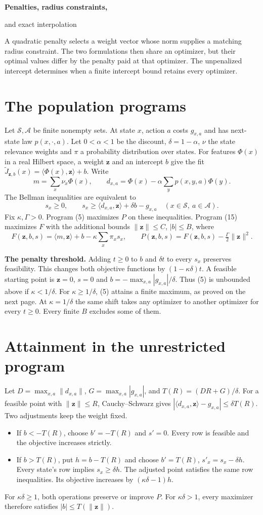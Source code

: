 \documentclass[12pt,a4paper]{article}
\newcommand{\ip}[2]{\langle #1,#2\rangle}
\newcommand{\norm}[1]{\lVert #1\rVert}
\newcommand{\vz}{\mathbf z}
\newcommand{\Jfit}{\widetilde J}
\newcommand{\lead}[1]{\par\smallskip\textbf{#1}\enspace}
\begin{document}
{\LARGE\bfseries Penalties, radius constraints,\par and exact interpolation\par}
\medskip
A quadratic penalty selects a weight vector whose norm supplies a matching radius
constraint. The two formulations then share an optimizer, but their optimal
values differ by the penalty paid at that optimizer. The unpenalized intercept
determines when a finite intercept bound retains every optimizer.

\section*{The population programs}
Let $\mathcal S,\mathcal A$ be finite nonempty sets. At state $x$, action $a$
costs $g_{x,a}$ and has next-state law $p(x,\cdot,a)$. Let $0<\alpha<1$ be
the discount, $\delta=1-\alpha$, $\nu$ the state relevance weights and $\pi$
a probability distribution over states. For features $\Phi(x)$ in a real
Hilbert space, a weight $\vz$ and an intercept $b$ give the fit
$\Jfit_{\vz,b}(x)=\ip{\Phi(x)}{\vz}+b$. Write
\[
 m=\sum_x\nu_x\Phi(x),\qquad
 d_{x,a}=\Phi(x)-\alpha\sum_y p(x,y,a)\Phi(y).
\]
The Bellman inequalities are equivalent to
\[
 s_x\ge0,\qquad s_x\ge\ip{d_{x,a}}{\vz}+\delta b-g_{x,a}
 \quad(x\in\mathcal S,\ a\in\mathcal A).
\]
Fix $\kappa,\Gamma>0$. Program (5) maximizes $P$ on these inequalities.
Program (15) maximizes $F$ with the additional bounds $\norm{\vz}\le C$,
$|b|\le B$, where
\[
 F(\vz,b,s)=\ip{m}{\vz}+b-\kappa\sum_x\pi_x s_x,\qquad
 P(\vz,b,s)=F(\vz,b,s)-\tfrac{\Gamma}{2}\norm{\vz}^2.
\]

\lead{The penalty threshold.}
Adding $t\ge0$ to $b$ and $\delta t$ to every $s_x$ preserves feasibility.
This changes both objective functions by $(1-\kappa\delta)t$.
A feasible starting point is $\vz=0$, $s=0$ and $b=-\max_{x,a}|g_{x,a}|/\delta$.
Thus (5) is unbounded above if $\kappa<1/\delta$.
For $\kappa\ge1/\delta$, (5) attains a finite maximum, as proved on the next page.
At $\kappa=1/\delta$ the same shift takes any optimizer to another optimizer
for every $t\ge0$. Every finite $B$ excludes some of them.

\newpage
\section*{Attainment in the unrestricted program}
Let $D=\max_{x,a}\norm{d_{x,a}}$, $G=\max_{x,a}|g_{x,a}|$, and
$T(R)=(DR+G)/\delta$. For a feasible point with $\norm{\vz}\le R$,
Cauchy--Schwarz gives $|\ip{d_{x,a}}{\vz}-g_{x,a}|\le\delta T(R)$.
Two adjustments keep the weight fixed.
\begin{itemize}
\item If $b<-T(R)$, choose $b'=-T(R)$ and $s'=0$. Every row is feasible
and the objective increases strictly.
\item If $b>T(R)$, put $h=b-T(R)$ and choose $b'=T(R)$,
$s'_x=s_x-\delta h$. Every state's row implies $s_x\ge\delta h$.
The adjusted point satisfies the same row inequalities. Its objective
increases by $(\kappa\delta-1)h$.
\end{itemize}
For $\kappa\delta\ge1$, both operations preserve or improve $P$. For
$\kappa\delta>1$, every maximizer therefore satisfies $|b|\le T(\norm{\vz})$.
\end{document}
